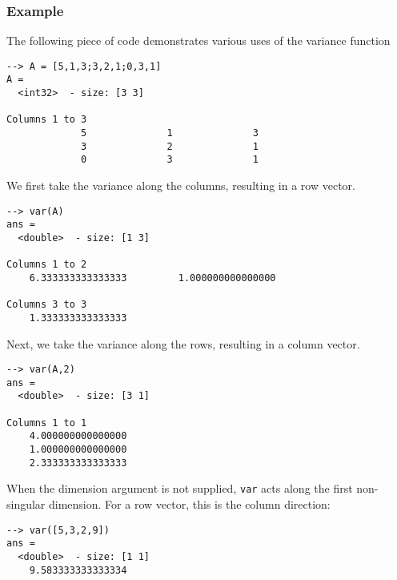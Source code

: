 \subsubsection{Example}
The following piece of code demonstrates various uses of the variance
function
\begin{verbatim}
--> A = [5,1,3;3,2,1;0,3,1]
A =
  <int32>  - size: [3 3]
  
Columns 1 to 3
             5              1              3
             3              2              1
             0              3              1
\end{verbatim}
We first take the variance along the columns, resulting in a row vector.
\begin{verbatim}
--> var(A)
ans =
  <double>  - size: [1 3]
  
Columns 1 to 2
    6.333333333333333         1.000000000000000
  
Columns 3 to 3
    1.333333333333333
\end{verbatim}
Next, we take the variance along the rows, resulting in a column vector.
\begin{verbatim}
--> var(A,2)
ans =
  <double>  - size: [3 1]
  
Columns 1 to 1
    4.000000000000000
    1.000000000000000
    2.333333333333333
\end{verbatim}
When the dimension argument is not supplied, \verb|var| acts along the first non-singular dimension.  For a row vector, this is the column direction:
\begin{verbatim}
--> var([5,3,2,9])
ans =
  <double>  - size: [1 1]
    9.583333333333334
\end{verbatim}
